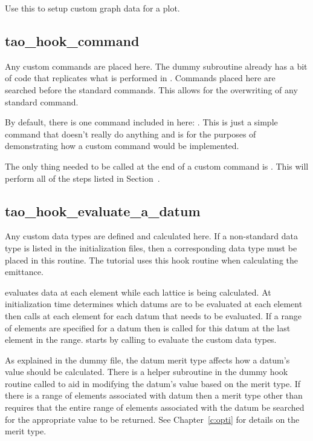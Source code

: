 Use this to setup custom graph data for a plot.

\subsection{tao\_hook\_command}

Any custom commands are placed here. The dummy subroutine already has
a bit of code that replicates what is performed in
. Commands placed here are searched before the
standard \tao commands. This allows for the overwriting of any
standard \tao command.

By default, there is one command included in here: . This
is just a simple command that doesn't really do anything and is for
the purposes of demonstrating how a custom command would be
implemented.

The only thing needed to be called at the end of a custom command is
. This will perform all of the steps listed in
Section~.

\subsection{tao\_hook\_evaluate\_a\_datum}

Any custom data types are defined and calculated here. If a
non-standard data type is listed in the initialization files, then a
corresponding data type must be placed in this routine. The tutorial
uses this hook routine when calculating the emittance.

\tao evaluates data at each element while each lattice is being
calculated. At initialization time \tao determines which datums are to
be evaluated at each element then calls  at
each element for each datum that needs to be evaluated. If a range of
elements are specified for a datum then  is
called for this datum at the last element in the
range.  starts by calling
 to evaluate the custom data types.

As explained in the dummy file, the datum merit type affects how a
datum's value should be calculated. There is a helper subroutine in
the dummy hook routine called  to aid in modifying the
datum's value based on the merit type. If there is a range of elements
associated with datum then a merit type other than 
requires that the entire range of elements associated with the datum
be searched for the appropriate value to be returned.  See
Chapter~\ref{c:opti} for details on the merit type.

